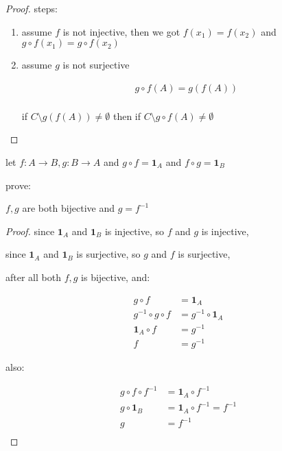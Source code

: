 \begin{proof}
    steps:

    \begin{enumerate}
        \item assume $f$ is not injective, then we got $f(x_1) = f(x_2)$ and $g \circ f(x_1) = g \circ f(x_2)$

        \item assume $g$ is not surjective

        \begin{align*}
            g \circ f(A) = g (f(A)) \\
        \end{align*}

        if $C \setminus g(f(A)) \ne \emptyset$ then if $C \setminus g \circ f(A) \ne \emptyset$
    \end{enumerate}
\end{proof}

\begin{exercise}
    let $f: A \to B, g: B \to A$ and $g \circ f = \mathbf{1}_A$ and $f \circ g = \mathbf{1}_B$

    prove:

    $f,g$ are both bijective and $g = f^{-1}$
\end{exercise}

\begin{proof}
    since $\mathbf{1}_A$ and $\mathbf{1}_B$ is injective,  so $f$ and $g$ is injective, 

    since $\mathbf{1}_A$ and $\mathbf{1}_B$ is surjective,  so $g$ and $f$ is surjective, 

    after all both $f,g$ is bijective, and:

    \begin{align*}
        g \circ f &= \mathbf{1}_A \\
        g^{-1} \circ g \circ f &= g^{-1} \circ \mathbf{1}_A \\
        \mathbf{1}_A \circ f & = g^{-1} \\
        f &= g^{-1}
    \end{align*}

    also:


    \begin{align*}
        g \circ f \circ f^{-1} &= \mathbf{1}_A \circ f^{-1} \\
        g \circ \mathbf{1}_B &=  \mathbf{1}_A \circ f^{-1} = f^{-1}\\
        g  & = f^{-1}\\
    \end{align*}
\end{proof}